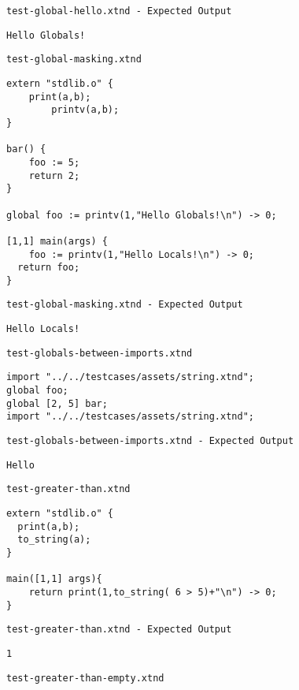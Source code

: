 \medskip \noindent \texttt{test-global-hello.xtnd - Expected Output}


\begin{lstlisting}
Hello Globals!
\end{lstlisting}


\medskip \noindent \texttt{test-global-masking.xtnd}


\begin{lstlisting}
extern "stdlib.o" {
	print(a,b);
		printv(a,b);
}

bar() {
	foo := 5;
	return 2;
}

global foo := printv(1,"Hello Globals!\n") -> 0;

[1,1] main(args) {
	foo := printv(1,"Hello Locals!\n") -> 0;
  return foo;
}
\end{lstlisting}


\medskip \noindent \texttt{test-global-masking.xtnd - Expected Output}


\begin{lstlisting}
Hello Locals!
\end{lstlisting}


\medskip \noindent \texttt{test-globals-between-imports.xtnd}


\begin{lstlisting}
import "../../testcases/assets/string.xtnd";
global foo;
global [2, 5] bar;
import "../../testcases/assets/string.xtnd";
\end{lstlisting}


\medskip \noindent \texttt{test-globals-between-imports.xtnd - Expected Output}


\begin{lstlisting}
Hello
\end{lstlisting}


\medskip \noindent \texttt{test-greater-than.xtnd}


\begin{lstlisting}
extern "stdlib.o" {
  print(a,b);
  to_string(a);
}

main([1,1] args){
	return print(1,to_string( 6 > 5)+"\n") -> 0;
}
\end{lstlisting}


\medskip \noindent \texttt{test-greater-than.xtnd - Expected Output}


\begin{lstlisting}
1
\end{lstlisting}


\medskip \noindent \texttt{test-greater-than-empty.xtnd}


